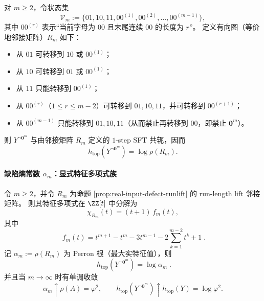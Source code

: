 \begin{proposition}\label{prop:real-input-defect-runlift}
对 $m\ge 2$，令状态集
\[
\mathcal{V}_m:=\{01,10,11,00^{(1)},00^{(2)},\dots,00^{(m-1)}\},
\]
其中 $00^{(r)}$ 表示“当前字母为 $00$ 且末尾连续 $00$ 的长度为 $r$”。
定义有向图（等价地邻接矩阵）$R_m$ 如下：
\begin{itemize}
  \item 从 $01$ 可转移到 $10$ 或 $00^{(1)}$；
  \item 从 $10$ 可转移到 $01$ 或 $00^{(1)}$；
  \item 从 $11$ 只能转移到 $00^{(1)}$；
  \item 从 $00^{(r)}$（$1\le r\le m-2$）可转移到 $01,10,11$，并可转移到 $00^{(r+1)}$；
  \item 从 $00^{(m-1)}$ 只能转移到 $01,10,11$（从而禁止再转移到 $00$，即禁止 $\mathbf{0}^m$）。
\end{itemize}
则 $Y^{\neg \mathbf{0}^m}$ 与由邻接矩阵 $R_m$ 定义的 $1$-step SFT 共轭，因而
\[
h_{\mathrm{top}}\!\left(Y^{\neg \mathbf{0}^m}\right)=\log\rho(R_m).
\]
\end{proposition}

\paragraph{缺陷熵常数 \texorpdfstring{$\alpha_m$}{alpha m}：显式特征多项式族}
\begin{theorem}[同步缺陷熵的显式代数结构]\label{thm:real-input-defect-entropy}
令 $m\ge 2$，并令 $R_m$ 为命题 \ref{prop:real-input-defect-runlift} 的 run-length lift 邻接矩阵。
则其特征多项式在 $\ZZ[t]$ 中分解为
\[
\chi_{R_m}(t)=(t+1)\,f_m(t),
\]
其中
\[
\boxed{\;
f_m(t)=t^{m+1}-t^{m}-3t^{m-1}-2\sum_{k=1}^{m-2}t^k+1\; }.
\]
记 $\alpha_m:=\rho(R_m)$ 为 Perron 根（最大实特征值），则
\[
\boxed{\;
h_{\mathrm{top}}\!\left(Y^{\neg \mathbf{0}^m}\right)=\log\alpha_m\; }.
\]
并且当 $m\to\infty$ 时有单调收敛
\[
\alpha_m\uparrow \rho(A)=\varphi^2,
\qquad
h_{\mathrm{top}}\!\left(Y^{\neg \mathbf{0}^m}\right)\uparrow h_{\mathrm{top}}(Y)=\log\varphi^2.
\]
\end{theorem}

